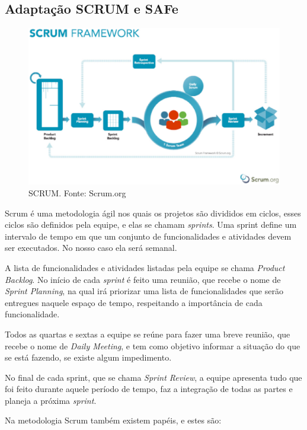 \subsection{Adaptação SCRUM e SAFe}

\begin{figure}[ht]
	\centering
    \includegraphics[keepaspectratio=true,scale=0.7]{figuras/scrum.eps}
    \caption[SCRUM.]{SCRUM. Fonte: Scrum.org}
	\label{fig:scrum}
\end{figure}

Scrum é uma metodologia ágil nos quais os projetos são divididos em ciclos, esses ciclos são definidos pela equipe, e elas se chamam \textit{sprints}. Uma sprint define um intervalo de tempo em que um conjunto de funcionalidades e atividades devem ser executados. No nosso caso ela será semanal.

A lista de funcionalidades e atividades listadas pela equipe se chama \textit{Product Backlog}. No início de cada \textit{sprint} é feito uma reunião, que recebe o nome de \textit{Sprint Planning}, na qual irá priorizar uma lista de funcionalidades que serão entregues naquele espaço de tempo, respeitando a importância de cada funcionalidade.

Todos as quartas e sextas a equipe se reúne para fazer uma breve reunião, que recebe o nome de \textit{Daily Meeting}, e tem como objetivo informar a situação do que se está fazendo, se existe algum impedimento.

No final de cada sprint, que se chama \textit{Sprint Review}, a equipe apresenta tudo que foi feito durante aquele período de tempo, faz a integração de todas as partes e planeja a próxima \textit{sprint}.

Na metodologia Scrum também existem papéis, e estes são:

